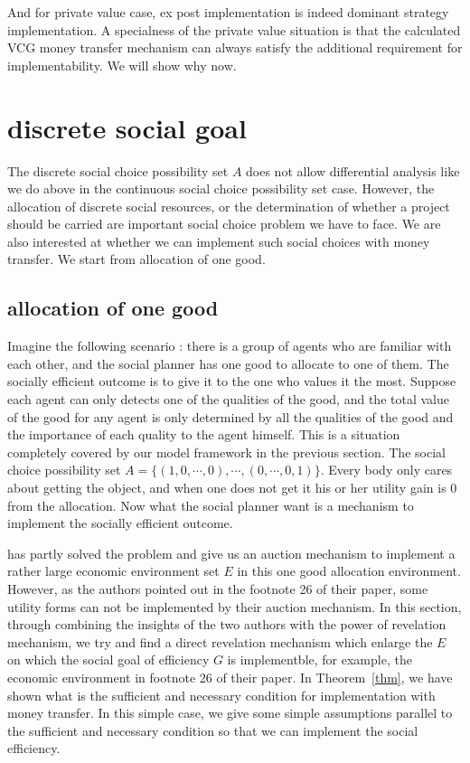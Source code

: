 \begin{prop}
And for private value case, 
ex post implementation is indeed dominant strategy implementation. A specialness of the private value situation is that the calculated
VCG money transfer mechanism can always satisfy the additional requirement for implementability. We will show why now. 
\section{discrete social goal}
The discrete social choice possibility set $A$ does not allow differential analysis like we do above in the continuous social choice
possibility set case. However, the allocation of discrete social resources, or the determination of whether a project should be carried
are important social choice problem we have to face. We are also interested at whether we can implement such social choices with money
transfer. We start from allocation of one good.

\subsection{allocation of one good }

Imagine the following scenario : there is a group of agents who are familiar with each other, and the social planner has
one good to allocate to one of them. The socially efficient outcome is to give it to the one who 
values it the most. Suppose each agent can only detects one of the qualities of the good, and the total value of the 
good for any agent is only determined by all the qualities of the good and the importance of each quality to the agent 
himself. This is a situation completely covered by our model framework in the previous section. The social choice possibility
set $A=\{(1,0,\cdots,0),\cdots,(0,\cdots,0,1)\}$. Every body only cares about getting the object, and when one does not get it his or
her utility gain is 0 from the allocation. Now what the social planner want is a mechanism to implement the socially efficient outcome. 

\parencite{Maskin00} has partly solved the problem and give us an auction mechanism to implement a rather large economic 
environment set $E$ in this one good allocation environment. However, as the authors pointed out in the footnote 26 of 
their paper, some utility forms can not be implemented by their auction mechanism. In this section, through combining the 
insights of the two authors with the power of revelation mechanism, we try and find a direct revelation mechanism  which
enlarge the $E$ on which the social goal of efficiency $G$ is implementble, for example, the economic environment in footnote
26 of their paper.
In Theorem~\ref{thm}, we have shown what is the sufficient and necessary condition for implementation with money 
transfer. In this simple case, we give some simple assumptions parallel to the sufficient and necessary condition
so that we can implement the social efficiency.


\end{prop}
